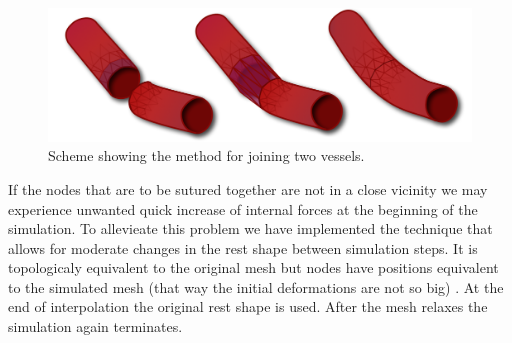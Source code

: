 \begin{figure}[tbh]
\begin{center}
\includegraphics[width=\columnwidth]{img/rest_shape_scheme.png}
\end{center}

\caption{Scheme showing the method for joining two vessels.  }
\label{fig-JoiningVessels}
\end{figure}

If the nodes that are to be sutured together are not in a close vicinity we may experience unwanted quick increase of internal forces at the beginning of the simulation.
To allevieate this problem we have implemented the technique that allows for moderate changes in the rest shape between simulation steps.
It is topologicaly equivalent to the original mesh but nodes have positions equivalent to the simulated mesh (that way the initial deformations are not so big) . 
At the end of interpolation the original rest shape is used. 
After the mesh relaxes the simulation again terminates.

